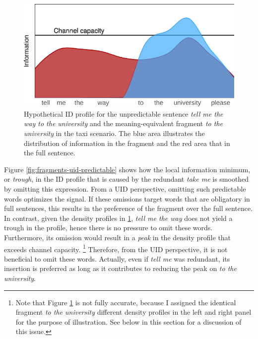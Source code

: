 \begin{figure}[t]
\includegraphics[scale=1]{figures/uid-example-sentence}
\caption{Hypothetical ID profile for the unpredictable sentence \textit{tell me the way to the university} and the meaning-equivalent fragment \textit{to the university} in the taxi scenario. The blue area illustrates the distribution of information in the fragment and the red area that in the full sentence.\label{fig:fragments-uid-unpredictable}}
\end{figure}
%
Figure \ref{fig:fragments-uid-predictable} shows how the local information minimum, or \textit{trough}, in the ID profile that is caused by the redundant \textit{take me} is smoothed by omitting this expression. From a UID perspective, omitting such predictable words optimizes the signal. If these omissions target words that are obligatory in full sentences, this results in the preference of the fragment over the full sentence. In contrast, given the density profiles in \ref{fig:fragments-uid-unpredictable}, \textit{tell me the way} does not yield a trough in the profile, hence there is no pressure to omit these words. Furthermore, its omission would result in a \textit{peak} in the density profile that exceeds channel capacity.%
%
\footnote{Note that Figure \ref{fig:fragments-uid-unpredictable} is not fully accurate, because I assigned the identical fragment \textit{to the university} different density profiles in the left and right panel for the purpose of illustration. See below in this section for a discussion of this issue.}\afterfn%
%
Therefore, from the UID perspective, it is not beneficial to omit these words. Actually, even if \textit{tell me} was redundant, its insertion is preferred as long as it contributes to reducing the peak on \textit{to the university}. 

